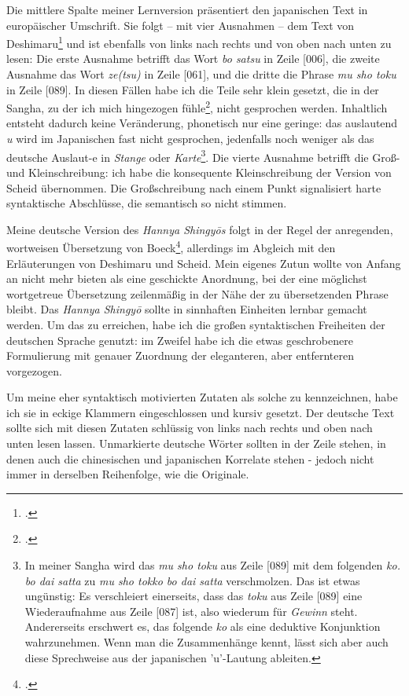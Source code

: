 \documentclass[
DIV=calc,
BCOR=5mm,
11pt,
headings=small,
oneside,
bibtotocnumbered,
english,ngerman]{scrartcl}
\begin{document}
Die mittlere Spalte meiner Lernversion präsentiert den japanischen Text in
europäischer Umschrift. Sie folgt -- mit vier Ausnahmen -- dem Text von
Deshimaru\footcite[vgl.][30]{Deshimaru1988a} und ist ebenfalls von links nach
rechts und von oben nach unten zu lesen: Die erste Ausnahme betrifft das Wort
\emph{bo satsu} in Zeile [006], die zweite Ausnahme das Wort \emph{ze(tsu)} in
Zeile [061], und die dritte die Phrase \emph{mu sho toku} in Zeile [089]. In
diesen Fällen habe ich die Teile sehr klein gesetzt, die in der Sangha, zu der
ich mich hingezogen fühle\footcite[vgl.][\nopage]{DaiShinZen2016a}, nicht
gesprochen werden. Inhaltlich entsteht dadurch keine Veränderung, phonetisch nur
eine geringe: das auslautend \emph{u} wird im Japanischen fast nicht gesprochen,
jedenfalls noch weniger als das deutsche Auslaut-e in \emph{Stange} oder
\emph{Karte}\footnote{In meiner Sangha wird das \emph{mu sho toku} aus Zeile
[089] mit dem folgenden \emph{ko. bo dai satta} zu \emph{mu sho tokko bo dai
satta} verschmolzen. Das ist etwas ungünstig: Es verschleiert einerseits, dass
das \emph{toku} aus Zeile [089] eine Wiederaufnahme aus Zeile [087] ist, also
wiederum für \emph{Gewinn} steht. Andererseits erschwert es, das folgende
\emph{ko} als eine deduktive Konjunktion wahrzunehmen. Wenn man die
Zusammenhänge kennt, lässt sich aber auch diese Sprechweise aus der japanischen
'u'-Lautung ableiten.}. Die vierte Ausnahme betrifft die Groß- und
Kleinschreibung: ich habe die konsequente Kleinschreibung der Version von Scheid
übernommen. Die Großschreibung nach einem Punkt signalisiert harte syntaktische
Abschlüsse, die semantisch so nicht stimmen.

Meine deutsche Version des \emph{Hannya Shingyōs} folgt in der Regel der
anregenden, wortweisen Übersetzung von
Boeck\footcite[vgl.][\nopage]{Boeck2016a}, allerdings im Abgleich mit den
Erläuterungen von Deshimaru und Scheid. Mein eigenes Zutun wollte von Anfang an
nicht mehr bieten als eine geschickte Anordnung, bei der eine möglichst
wortgetreue Übersetzung zeilenmäßig in der Nähe der zu übersetzenden Phrase
bleibt. Das \emph{Hannya Shingyō} sollte in sinnhaften Einheiten lernbar gemacht
werden. Um das zu erreichen, habe ich die großen syntaktischen Freiheiten der
deutschen Sprache genutzt: im Zweifel habe ich die etwas geschrobenere
Formulierung mit genauer Zuordnung der eleganteren, aber entfernteren
vorgezogen.

Um meine eher syntaktisch motivierten Zutaten als solche zu kennzeichnen, habe
ich sie in eckige Klammern eingeschlossen und kursiv gesetzt. Der deutsche Text
sollte sich mit diesen Zutaten schlüssig von links nach rechts und oben nach
unten lesen lassen. Unmarkierte deutsche Wörter sollten in der Zeile stehen, in
denen auch die chinesischen und japanischen Korrelate stehen - jedoch nicht
immer in derselben Reihenfolge, wie die Originale.
\end{document}
